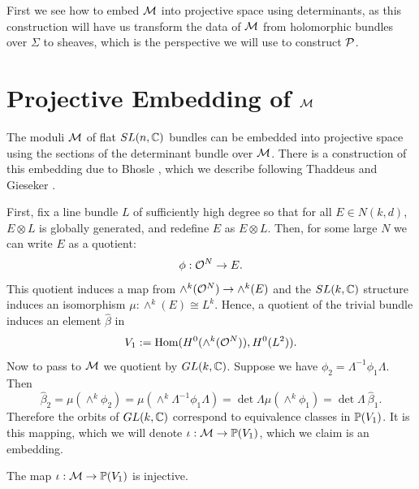 	First we see how to embed $\mathcal{M}$ into projective space using determinants, as this construction will have us transform the data of $\mathcal{M}$ from holomorphic bundles over $\Sigma$ to sheaves, which is the perspective we will use to construct $\mathcal{P}$.
	\section{Projective Embedding of $\mathcal{M}$}
	\label{s:m-embedding}
	The moduli $\mathcal{M}$ of flat $SL(n,\mathbb{C})$ bundles can be embedded into projective space using the sections of the determinant bundle over $\mathcal{M}$. There is a construction of this embedding due to Bhosle \cite{bhosle_parabolic_1989}, which we describe following Thaddeus and Gieseker \cite[\S 7]{thaddeus_geometric_1996}\cite{gieseker_moduli_1977}. 
	
	First, fix a line bundle $L$ of sufficiently high degree so that for all $E\in N(k,d)$, $E\otimes L$  is globally generated, and redefine $E$ as $E\otimes L$. Then, for some large $N$ we can write $E$ as a quotient:
	\begin{equation}
	\phi:\mathcal{O}^N \to E.
	\end{equation}
	This quotient induces a map from $\wedge^k(\mathcal{O}^N) \to \wedge^k(E)$ and the $SL(k,\mathbb{C})$ structure induces an isomorphism $\mu:\wedge^k(E)\cong L^k$. Hence, a quotient of the trivial bundle induces an element $\hat{\beta}$ in 
	\begin{equation}
	V_1 := \text{Hom}(H^0(\wedge^k(\mathcal{O}^N)), H^0(L^2)).
	\end{equation}
	Now to pass to $\mathcal{M}$ we quotient by $GL(k,\mathbb{C})$. Suppose we have $\phi_2 = \Lambda^{-1} \phi_1 \Lambda$. Then
	\begin{equation}
		\hat{\beta}_2 = \mu(\wedge^k \phi_2) = \mu(\wedge^k \Lambda^{-1}\phi_1 \Lambda) = \det\Lambda \mu(\wedge^k \phi_1) = \det\Lambda~ \hat{\beta}_1.
	\end{equation}
	Therefore the orbits of $GL(k,\mathbb{C})$ correspond to equivalence classes in $\mathbb{P}(V_1)$. It is this mapping, which we will denote $\iota:\mathcal{M}\to \mathbb{P}(V_1)$, which we claim is an embedding. 
	\begin{lemma}
		The map $\iota:\mathcal{M} \to \mathbb{P}(V_1)$ is injective.
	\end{lemma}
